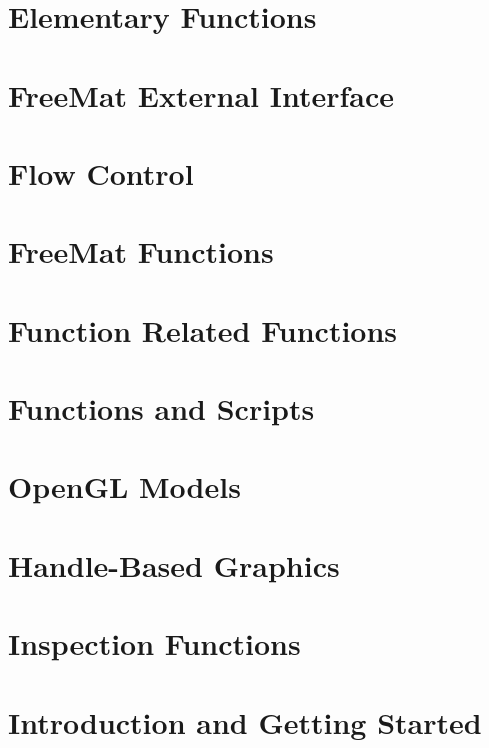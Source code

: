 \documentclass{book}
\begin{document}
\chapter{Elementary Functions}
\label{sec_elementary}
\hypertarget{sec_elementary}{}

\chapter{Free\-Mat External Interface}
\label{sec_external}
\hypertarget{sec_external}{}

\chapter{Flow Control}
\label{sec_flow}
\hypertarget{sec_flow}{}

\chapter{Free\-Mat Functions}
\label{sec_freemat}
\hypertarget{sec_freemat}{}

\chapter{Function Related Functions}
\label{sec_function}
\hypertarget{sec_function}{}

\chapter{Functions and Scripts}
\label{sec_functions}
\hypertarget{sec_functions}{}

\chapter{Open\-G\-L Models}
\label{sec_glwin}
\hypertarget{sec_glwin}{}

\chapter{Handle-\/\-Based Graphics}
\label{sec_handle}
\hypertarget{sec_handle}{}

\chapter{Inspection Functions}
\label{sec_inspection}
\hypertarget{sec_inspection}{}

\chapter{Introduction and Getting Started}
\label{sec_introduction}
\hypertarget{sec_introduction}{}

\end{document}
